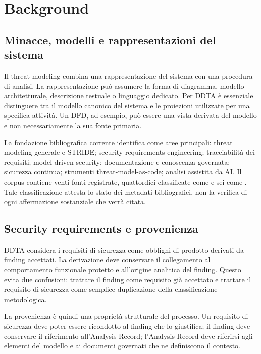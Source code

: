 \documentclass[12pt,a4paper,oneside]{report}
\newcommand{\artifact}[1]{{\ttfamily\seqsplit{#1}}}
\begin{document}
\chapter{Background}

\section{Minacce, modelli e rappresentazioni del sistema}

Il threat modeling combina una rappresentazione del sistema con una procedura di analisi. La rappresentazione può assumere la forma di diagramma, modello architetturale, descrizione testuale o linguaggio dedicato. Per DDTA è essenziale distinguere tra il modello canonico del sistema e le proiezioni utilizzate per una specifica attività. Un DFD, ad esempio, può essere una vista derivata del modello e non necessariamente la sua fonte primaria.

La fondazione bibliografica corrente identifica come aree principali: threat modeling generale e STRIDE; security requirements engineering; tracciabilità dei requisiti; model-driven security; documentazione e conoscenza governata; sicurezza continua; strumenti threat-model-as-code; analisi assistita da AI. Il corpus contiene venti fonti registrate, quattordici classificate come \artifact{verified} e sei come \artifact{partially\_verified}. Tale classificazione attesta lo stato dei metadati bibliografici, non la verifica di ogni affermazione sostanziale che verrà citata.

\section{Security requirements e provenienza}

DDTA considera i requisiti di sicurezza come obblighi di prodotto derivati da finding accettati. La derivazione deve conservare il collegamento al comportamento funzionale protetto e all'origine analitica del finding. Questo evita due confusioni: trattare il finding come requisito già accettato e trattare il requisito di sicurezza come semplice duplicazione della classificazione metodologica.

La provenienza è quindi una proprietà strutturale del processo. Un requisito di sicurezza deve poter essere ricondotto al finding che lo giustifica; il finding deve conservare il riferimento all'Analysis Record; l'Analysis Record deve riferirsi agli elementi del modello e ai documenti governati che ne definiscono il contesto.
\end{document}
